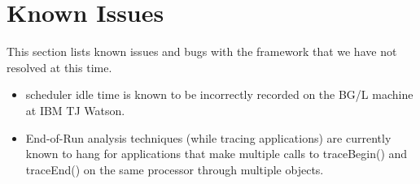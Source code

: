 \documentclass[10pt]{report}
\begin{document}
\section{Known Issues}
\label{sec::known issues}

This section lists known issues and bugs with the \projections{}
framework that we have not resolved at this time.

\begin{itemize}
\item
\charmpp{} scheduler idle time is known to be incorrectly recorded on
the BG/L machine at IBM TJ Watson.
\item
End-of-Run analysis techniques (while tracing applications) are
currently known to hang for applications that make multiple calls to
traceBegin() and traceEnd() on the same processor through multiple
\charmpp{} objects.
\end{itemize}
\end{document}
